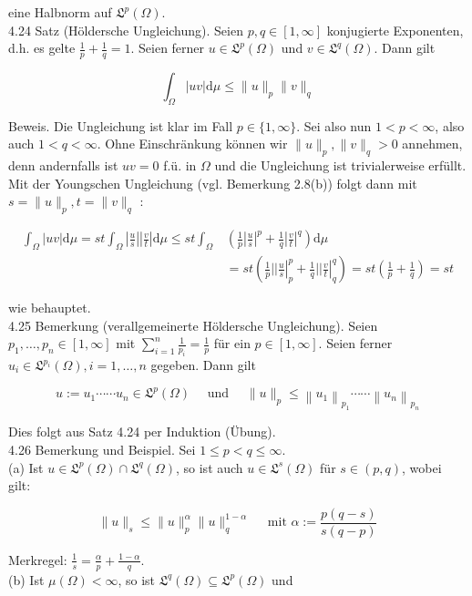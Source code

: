 \documentclass[10pt, letterpaper]{article}
\begin{document}
eine Halbnorm auf $\mathfrak{L}^{p}(\Omega)$.\\
4.24 Satz (Höldersche Ungleichung). Seien $p, q \in[1, \infty]$ konjugierte Exponenten, d.h. es gelte $\frac{1}{p}+\frac{1}{q}=1$. Seien ferner $u \in \mathfrak{L}^{p}(\Omega)$ und $v \in \mathfrak{L}^{q}(\Omega)$. Dann gilt

$$
\int_{\Omega}|u v| \mathrm{d} \mu \leq\|u\|_{p}\|v\|_{q}
$$

Beweis. Die Ungleichung ist klar im Fall $p \in\{1, \infty\}$. Sei also nun $1<p<\infty$, also auch $1<q<\infty$. Ohne Einschränkung können wir $\|u\|_{p},\|v\|_{q}>0$ annehmen, denn andernfalls ist $u v=0$ f.ü. in $\Omega$ und die Ungleichung ist trivialerweise erfüllt. Mit der Youngschen Ungleichung (vgl. Bemerkung 2.8(b)) folgt dann mit $s=\|u\|_{p}, t=\|v\|_{q}$ :

$$
\begin{aligned}
\int_{\Omega}|u v| \mathrm{d} \mu=s t \int_{\Omega}\left|\frac{u}{s}\right|\left|\frac{v}{t}\right| \mathrm{d} \mu \leq s t \int_{\Omega} & \left(\frac{1}{p}\left|\frac{u}{s}\right|^{p}+\frac{1}{q}\left|\frac{v}{t}\right|^{q}\right) \mathrm{d} \mu \\
& =s t\left(\left.\frac{1}{p}| | \frac{u}{s}\right|_{p} ^{p}+\left.\frac{1}{q}| | \frac{v}{t}\right|_{q} ^{q}\right)=s t\left(\frac{1}{p}+\frac{1}{q}\right)=s t
\end{aligned}
$$

wie behauptet.\\
4.25 Bemerkung (verallgemeinerte Höldersche Ungleichung). Seien $p_{1}, \ldots, p_{n} \in[1, \infty]$ mit $\sum_{i=1}^{n} \frac{1}{p_{i}}=\frac{1}{p}$ für ein $p \in[1, \infty]$. Seien ferner $u_{i} \in \mathfrak{L}^{p_{i}}(\Omega), i=1, \ldots, n$ gegeben. Dann gilt

$$
u:=u_{1} \cdots \cdots u_{n} \in \mathfrak{L}^{p}(\Omega) \quad \text { und } \quad\|u\|_{p} \leq\left\|u_{1}\right\|_{p_{1}} \cdots \cdots\left\|u_{n}\right\|_{p_{n}}
$$

Dies folgt aus Satz 4.24 per Induktion (Übung).\\
4.26 Bemerkung und Beispiel. Sei $1 \leq p<q \leq \infty$.\\
(a) Ist $u \in \mathfrak{L}^{p}(\Omega) \cap \mathfrak{L}^{q}(\Omega)$, so ist auch $u \in \mathfrak{L}^{s}(\Omega)$ für $s \in(p, q)$, wobei gilt:

$$
\|u\|_{s} \leq\|u\|_{p}^{\alpha}\|u\|_{q}^{1-\alpha} \quad \text { mit } \alpha:=\frac{p(q-s)}{s(q-p)}
$$

Merkregel: $\frac{1}{s}=\frac{\alpha}{p}+\frac{1-\alpha}{q}$.\\
(b) Ist $\mu(\Omega)<\infty$, so ist $\mathfrak{L}^{q}(\Omega) \subseteq \mathfrak{L}^{p}(\Omega)$ und
\end{document}
